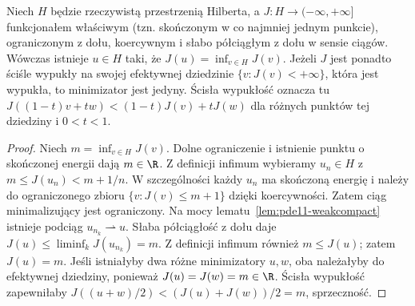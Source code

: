 \begin{twierdzenie}
\label{thm:pde11-direct}
Niech $H$ będzie rzeczywistą przestrzenią Hilberta,
a $J:H\to(-\infty,+\infty]$ funkcjonałem właściwym
(tzn. skończonym w co najmniej jednym punkcie),
ograniczonym z dołu, koercywnym i słabo półciągłym
z dołu w sensie ciągów.
Wówczas istnieje $u\in H$ taki, że
$J(u)=\inf_{v\in H}J(v)$.
Jeżeli $J$ jest ponadto ściśle wypukły na swojej
efektywnej dziedzinie $\{v:J(v)<+\infty\}$, która
jest wypukła, to minimizator jest jedyny.
Ścisła wypukłość oznacza tu
$J((1-t)v+tw)<(1-t)J(v)+tJ(w)$ dla różnych punktów
tej dziedziny i $0<t<1$.
\end{twierdzenie}
\begin{proof}
Niech $m=\inf_{v\in H}J(v)$. Dolne ograniczenie
i istnienie punktu o skończonej energii dają $m\in\R$.
Z definicji infimum wybieramy $u_n\in H$ z
$m\le J(u_n)<m+1/n$. W szczególności każdy $u_n$
ma skończoną energię i należy do ograniczonego
zbioru $\{v:J(v)\le m+1\}$ dzięki koercywności.
Zatem ciąg minimalizujący jest ograniczony.
Na mocy lematu~\ref{lem:pde11-weakcompact}
istnieje podciąg $u_{n_k}\rightharpoonup u$.
Słaba półciągłość z dołu daje
$J(u)\le\liminf_kJ(u_{n_k})=m$.
Z definicji infimum również $m\le J(u)$;
zatem $J(u)=m$.
Jeśli istniałyby dwa różne minimizatory $u,w$,
oba należałyby do efektywnej dziedziny, ponieważ
$J(u)=J(w)=m\in\R$. Ścisła wypukłość zapewniłaby
$J((u+w)/2)<(J(u)+J(w))/2=m$, sprzeczność.
\end{proof}

